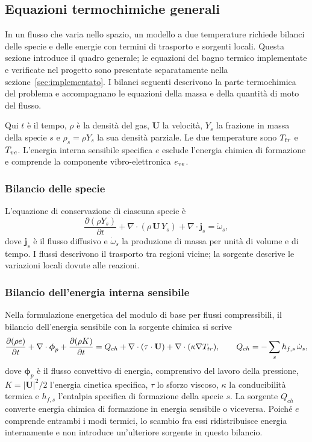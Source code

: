\subsection{Equazioni termochimiche generali}
\label{sec:equazioni-generali}

In un flusso che varia nello spazio, un modello a due temperature richiede
bilanci delle specie e delle energie con termini di trasporto e sorgenti
locali. Questa sezione introduce il quadro generale; le equazioni del bagno
termico implementate e verificate nel progetto sono presentate separatamente
nella sezione~\ref{sec:implementato}. I bilanci seguenti descrivono la parte
termochimica del problema e accompagnano le equazioni della massa e della
quantità di moto del flusso.

Qui $t$ è il tempo, $\rho$ è la densità del gas, $\mathbf{U}$ la velocità, $Y_s$ la frazione
in massa della specie $s$ e $\rho_s=\rho Y_s$ la sua densità parziale. Le due
temperature sono $T_{tr}$ e $T_{ve}$. L'energia interna sensibile specifica $e$
esclude l'energia chimica di formazione e comprende la componente
vibro-elettronica $e_{ve}$.

\subsubsection{Bilancio delle specie}

L'equazione di conservazione di ciascuna specie è
\begin{equation}
  \frac{\partial (\rho Y_s)}{\partial t}
  + \nabla\cdot(\rho\,\mathbf{U}\,Y_s)
  + \nabla\cdot\mathbf{j}_s = \dot\omega_s ,
\end{equation}
dove $\mathbf{j}_s$ è il flusso diffusivo e $\dot\omega_s$ la produzione di
massa per unità di volume e di tempo. I flussi descrivono il trasporto tra
regioni vicine; la sorgente descrive le variazioni locali dovute alle reazioni.

\subsubsection{Bilancio dell'energia interna sensibile}

Nella formulazione energetica del modulo di base per flussi compressibili,
il bilancio dell'energia sensibile con la sorgente chimica si scrive
\begin{equation}
  \frac{\partial (\rho e)}{\partial t}
  + \nabla\cdot\boldsymbol\phi_p
  + \frac{\partial (\rho K)}{\partial t}
  = Q_{ch}
  + \nabla\cdot(\tau\cdot\mathbf{U})
  + \nabla\cdot(\kappa\nabla T_{tr}) ,
  \qquad
  Q_{ch} = -\sum_s h_{f,s}\,\dot\omega_s ,
\end{equation}
dove $\boldsymbol\phi_p$ è il flusso convettivo di energia, comprensivo del
lavoro della pressione, $K=|\mathbf{U}|^2/2$ l'energia cinetica specifica,
$\tau$ lo sforzo viscoso, $\kappa$ la conducibilità termica e $h_{f,s}$
l'entalpia specifica di formazione della specie $s$. La sorgente $Q_{ch}$
converte energia chimica di formazione in energia sensibile o viceversa.
Poiché $e$ comprende entrambi i modi termici, lo scambio fra essi ridistribuisce
energia internamente e non introduce un'ulteriore sorgente in questo bilancio.


